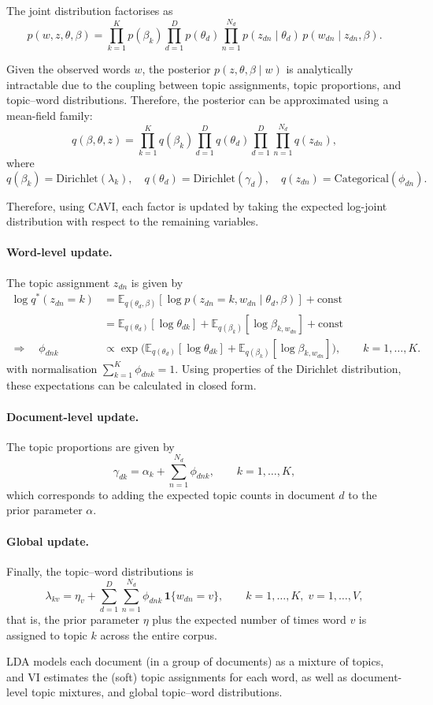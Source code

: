 The joint distribution factorises as
\[
p(w,z,\theta,\beta)
=
\prod_{k=1}^K p(\beta_k)
\prod_{d=1}^D p(\theta_d)
\prod_{n=1}^{N_d} p(z_{dn}\mid \theta_d)\,p(w_{dn}\mid z_{dn},\beta).
\]

Given the observed words $w$, the posterior
$p(z,\theta,\beta \mid w)$
is analytically intractable due to the coupling between topic assignments, topic
proportions, and topic--word distributions. Therefore, the posterior can be approximated using a mean-field family:
\[
q(\beta,\theta,z)
=
\prod_{k=1}^K q(\beta_k)
\prod_{d=1}^D q(\theta_d)
\prod_{d=1}^D \prod_{n=1}^{N_d} q(z_{dn}),
\]
where
\[
q(\beta_k)=\mathrm{Dirichlet}(\lambda_k),
\quad
q(\theta_d)=\mathrm{Dirichlet}(\gamma_d),
\quad
q(z_{dn})=\mathrm{Categorical}(\phi_{dn}).
\]

Therefore, using CAVI, each factor is updated by taking the
expected log-joint distribution with respect to the remaining variables. 

\paragraph{Word-level update.} The topic assignment $z_{dn}$ is given by
\begin{align}
\log q^*(z_{dn}=k)
&=
\mathbb{E}_{q(\theta_d,\beta)}
\!\left[
\log p(z_{dn}=k,w_{dn}\mid \theta_d,\beta)
\right]
+ \text{const}
\\
&=
\mathbb{E}_{q(\theta_d)}[\log \theta_{dk}]
+
\mathbb{E}_{q(\beta_k)}[\log \beta_{k,w_{dn}}]
+ \text{const}
\\
\Rightarrow\quad
\phi_{dnk}
&\propto
\exp\!\Big(
\mathbb{E}_{q(\theta_d)}[\log \theta_{dk}]
+
\mathbb{E}_{q(\beta_k)}[\log \beta_{k,w_{dn}}]
\Big),
\qquad k=1,\dots,K .
\end{align}
with normalisation $\sum_{k=1}^K \phi_{dnk}=1$. Using properties of the Dirichlet
distribution, these expectations can be calculated in closed form.

\paragraph{Document-level update.} The topic proportions are given by 
\[
\gamma_{dk}
=
\alpha_k + \sum_{n=1}^{N_d} \phi_{dnk},
\qquad k=1,\dots,K,
\]
which corresponds to adding the expected topic counts in document $d$ to the prior
parameter $\alpha$.

\paragraph{Global update.} Finally, the topic--word distributions is
\[
\lambda_{kv}
=
\eta_v + \sum_{d=1}^D \sum_{n=1}^{N_d} \phi_{dnk}\,\mathbf 1\{w_{dn}=v\},
\qquad k=1,\dots,K,\; v=1,\dots,V,
\]
that is, the prior parameter $\eta$ plus the expected number of times word $v$ is
assigned to topic $k$ across the entire corpus.

LDA models each document (in a group of documents) as a mixture of topics, and VI estimates the (soft) topic assignments for each word, as well as  document-level topic mixtures, and global topic--word distributions. 


